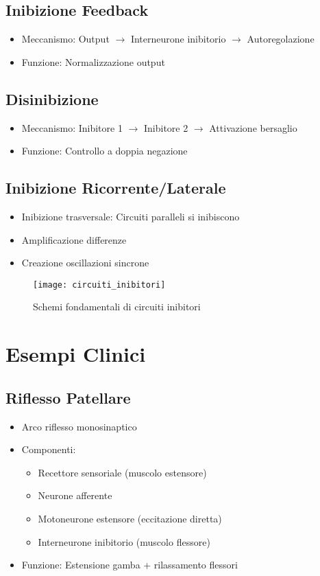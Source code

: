 \documentclass[12pt]{article}
\begin{document}
\subsection{Inibizione Feedback}
\begin{itemize}
    \item Meccanismo: Output $\rightarrow$ Interneurone inibitorio $\rightarrow$ Autoregolazione
    \item Funzione: Normalizzazione output
\end{itemize}

\subsection{Disinibizione}
\begin{itemize}
    \item Meccanismo: Inibitore 1 $\rightarrow$ Inibitore 2 $\rightarrow$ Attivazione bersaglio
    \item Funzione: Controllo a doppia negazione
\end{itemize}

\subsection{Inibizione Ricorrente/Laterale}
\begin{itemize}
    \item Inibizione trasversale: Circuiti paralleli si inibiscono
    \item Amplificazione differenze
    \item Creazione oscillazioni sincrone
\end{itemize}

\begin{figure}[h]
    \centering
    \texttt{[image: circuiti\_inibitori]}
    \caption{Schemi fondamentali di circuiti inibitori}
\end{figure}

\section{Esempi Clinici}
\subsection{Riflesso Patellare}
\begin{itemize}
    \item Arco riflesso monosinaptico
    \item Componenti:
    \begin{itemize}
        \item Recettore sensoriale (muscolo estensore)
        \item Neurone afferente
        \item Motoneurone estensore (eccitazione diretta)
        \item Interneurone inibitorio (muscolo flessore)
    \end{itemize}
    \item Funzione: Estensione gamba + rilassamento flessori
\end{itemize}
\end{document}
